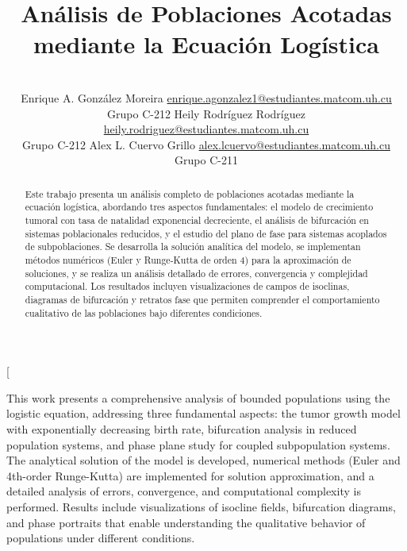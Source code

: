 \documentclass[a4paper,10pt,twocolumn]{article}
\title{Análisis de Poblaciones Acotadas mediante la Ecuación Logística}
\author{\\
\name Enrique A. González Moreira \email \href{mailto:enrique.agonzalez1@estudiantes.matcom.uh.cu}{enrique.agonzalez1@estudiantes.matcom.uh.cu}
	\\ \addr Grupo C-212 \AND
\name Heily Rodríguez Rodríguez \email \href{mailto:heily.rodriguez@estudiantes.matcom.uh.cu}{heily.rodriguez@estudiantes.matcom.uh.cu}
  \\ \addr Grupo C-212 \AND
\name Alex L. Cuervo Grillo \email \href{mailto:alex.lcuervo@estudiantes.matcom.uh.cu}{alex.lcuervo@estudiantes.matcom.uh.cu}
  \\ \addr Grupo C-211}
\begin{document}
\twocolumn[

\maketitle


\begin{abstract}

	Este trabajo presenta un análisis completo de poblaciones acotadas mediante la ecuación logística, abordando tres aspectos fundamentales: el modelo de crecimiento tumoral con tasa de natalidad exponencial decreciente, el análisis de bifurcación en sistemas poblacionales reducidos, y el estudio del plano de fase para sistemas acoplados de subpoblaciones. Se desarrolla la solución analítica del modelo, se implementan métodos numéricos (Euler y Runge-Kutta de orden 4) para la aproximación de soluciones, y se realiza un análisis detallado de errores, convergencia y complejidad computacional. Los resultados incluyen visualizaciones de campos de isoclinas, diagramas de bifurcación y retratos fase que permiten comprender el comportamiento cualitativo de las poblaciones bajo diferentes condiciones.

\end{abstract}

\vspace{0.5cm}

\begin{enabstract}

  This work presents a comprehensive analysis of bounded populations using the logistic equation, addressing three fundamental aspects: the tumor growth model with exponentially decreasing birth rate, bifurcation analysis in reduced population systems, and phase plane study for coupled subpopulation systems. The analytical solution of the model is developed, numerical methods (Euler and 4th-order Runge-Kutta) are implemented for solution approximation, and a detailed analysis of errors, convergence, and computational complexity is performed. Results include visualizations of isocline fields, bifurcation diagrams, and phase portraits that enable understanding the qualitative behavior of populations under different conditions.

\end{enabstract}
\end{document}
